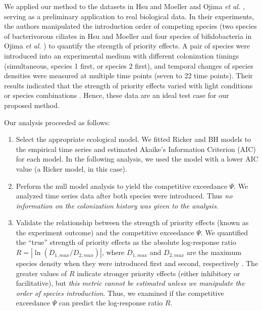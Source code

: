 \documentclass[12pt, class=article, crop=false]{standalone}
\begin{document}
We applied our method to the datasets in Hsu and Moeller \citep{hsu_metabolic_2021} and Ojima \textit{et al.} \citep{ojima_priority_2022}, serving as a preliminary application to real biological data.
In their experiments, the authors manipulated the introduction order of competing species (two species of bacterivorous ciliates in Hsu and Moeller \citep{hsu_metabolic_2021} and four species of bifidobacteria in Ojima \textit{et al.} \citep{ojima_priority_2022}) to quantify the strength of priority effects.
A pair of species were introduced into an experimental medium with different colonization timings (simultaneous, species 1 first, or species 2 first), and temporal changes of species densities were measured at multiple time points (seven to 22 time points).
Their results indicated that the strength of priority effects varied with light conditions \citep{hsu_metabolic_2021} or species combinations \citep{ojima_priority_2022}.
Hence, these data are an ideal test case for our proposed method.

Our analysis proceeded as follows:

\begin{enumerate}
    \item Select the appropriate ecological model.
    We fitted Ricker and BH models to the empirical time series and estimated Akaike's Information Criterion (AIC) \citep{burnham_model_2002} for each model.
    In the following analysis, we used the model with a lower AIC value (a Ricker model, in this case).
    \item Perform the null model analysis to yield the competitive exceedance $\Psi$.
    We analyzed time series data after both species were introduced.
    Thus \textit{no information on the colonization history was given to the analysis}.
    \item Validate the relationship between the strength of priority effects (known as the experiment outcome) and the competitive exceedance $\Psi$.
    We quantified the ``true'' strength of priority effects as the absolute log-response ratio $R = |\ln (D_{1, max} / D_{2, max})|$, where $D_{1, max}$ and $D_{2, max}$ are the maximum species density when they were introduced first and second, respectively \citep{hsu_metabolic_2021}.
    The greater values of $R$ indicate stronger priority effects (either inhibitory or facilitative), but \textit{this metric cannot be estimated unless we manipulate the order of species introduction}.
    Thus, we examined if the competitive exceedance $\Psi$ can predict the log-response ratio $R$.
\end{enumerate}
\end{document}
